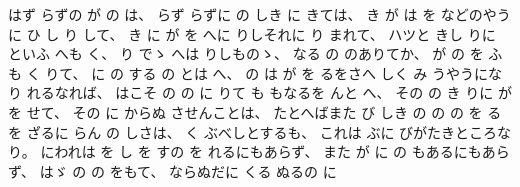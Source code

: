 %
はず
らずの
が
の
は、
%
らず
らずに
の
しき
に
きては、
%
き
が
は
を
などのやうに
ひ
し
り
して、
%
き
に
が
を
へに
りしそれに
り
まれて、
%
ハツと
きし
りに
といふ
へも
く、
%
り
でゝ
へは
りしものゝ、
%
なる
の
のありてか、
%
が
の
を
ふ
も
く
りて、
%
に
の
する
の
とは
へ、
%
の
は
が
を
るをさへ
しく
み
うやうになり
れるなれば、
%
はこそ
の
の
に
りて
も
もなるを
んと
へ、
%
その
の
き
りに
が
を
せて、
%
その
に
からぬ
させんことは、
%
たとへばまた
び
しき
の
の
の
を
るを
ざるに
らん
の
しさは、
%
く
ぶべしとするも、
%
これは
ぶに
びがたきところなり。
%
にわれは
を
し
を
すの%
を
れるにもあらず、
%
また
が
に
の
もあるにもあらず、
%
はゞ
の
の
をもて、
%
ならぬだに
くる
ぬるの
に
